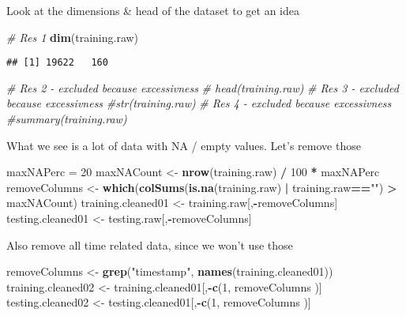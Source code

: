 \documentclass[]{article}
\newenvironment{Shaded}{\begin{snugshade}}{\end{snugshade}}
\newcommand{\CommentTok}[1]{\textcolor[rgb]{0.56,0.35,0.01}{\textit{#1}}}
\newcommand{\DecValTok}[1]{\textcolor[rgb]{0.00,0.00,0.81}{#1}}
\newcommand{\KeywordTok}[1]{\textcolor[rgb]{0.13,0.29,0.53}{\textbf{#1}}}
\newcommand{\NormalTok}[1]{#1}
\newcommand{\OperatorTok}[1]{\textcolor[rgb]{0.81,0.36,0.00}{\textbf{#1}}}
\newcommand{\StringTok}[1]{\textcolor[rgb]{0.31,0.60,0.02}{#1}}
\begin{document}
Look at the dimensions \& head of the dataset to get an idea

\begin{Shaded}
\begin{Highlighting}[]
\CommentTok{# Res 1}
\KeywordTok{dim}\NormalTok{(training.raw)}
\end{Highlighting}
\end{Shaded}

\begin{verbatim}
## [1] 19622   160
\end{verbatim}

\begin{Shaded}
\begin{Highlighting}[]
\CommentTok{# Res 2 - excluded because excessivness}
\CommentTok{# head(training.raw)}
\CommentTok{# Res 3 - excluded because excessivness}
\CommentTok{#str(training.raw)}
\CommentTok{# Res 4 - excluded because excessivness}
\CommentTok{#summary(training.raw)}
\end{Highlighting}
\end{Shaded}

What we see is a lot of data with NA / empty values. Let's remove those

\begin{Shaded}
\begin{Highlighting}[]
\NormalTok{maxNAPerc =}\StringTok{ }\DecValTok{20}
\NormalTok{maxNACount <-}\StringTok{ }\KeywordTok{nrow}\NormalTok{(training.raw) }\OperatorTok{/}\StringTok{ }\DecValTok{100} \OperatorTok{*}\StringTok{ }\NormalTok{maxNAPerc}
\NormalTok{removeColumns <-}\StringTok{ }\KeywordTok{which}\NormalTok{(}\KeywordTok{colSums}\NormalTok{(}\KeywordTok{is.na}\NormalTok{(training.raw) }\OperatorTok{|}\StringTok{ }\NormalTok{training.raw}\OperatorTok{==}\StringTok{""}\NormalTok{) }\OperatorTok{>}\StringTok{ }\NormalTok{maxNACount)}
\NormalTok{training.cleaned01 <-}\StringTok{ }\NormalTok{training.raw[,}\OperatorTok{-}\NormalTok{removeColumns]}
\NormalTok{testing.cleaned01 <-}\StringTok{ }\NormalTok{testing.raw[,}\OperatorTok{-}\NormalTok{removeColumns]}
\end{Highlighting}
\end{Shaded}

Also remove all time related data, since we won't use those

\begin{Shaded}
\begin{Highlighting}[]
\NormalTok{removeColumns <-}\StringTok{ }\KeywordTok{grep}\NormalTok{(}\StringTok{"timestamp"}\NormalTok{, }\KeywordTok{names}\NormalTok{(training.cleaned01))}
\NormalTok{training.cleaned02 <-}\StringTok{ }\NormalTok{training.cleaned01[,}\OperatorTok{-}\KeywordTok{c}\NormalTok{(}\DecValTok{1}\NormalTok{, removeColumns )]}
\NormalTok{testing.cleaned02 <-}\StringTok{ }\NormalTok{testing.cleaned01[,}\OperatorTok{-}\KeywordTok{c}\NormalTok{(}\DecValTok{1}\NormalTok{, removeColumns )]}
\end{Highlighting}
\end{Shaded}
\end{document}
